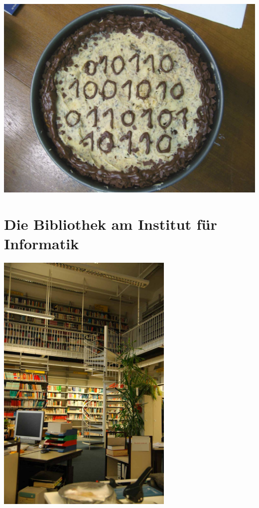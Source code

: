 \documentclass[a4paper,12pt]{scrartcl}
\newcommand{\spaltenanfang}{\begin{multicols}{2}}
\newcommand{\spaltenende}{\end{multicols}}
\begin{document}
\vspace{4mm}
\hspace{1cm}
\begin{center}
\includegraphics[scale=0.3]{bitmaps/101_kuchen}
\end{center}


\newpage
\section{Die Bibliothek am Institut für Informatik}
\spaltenanfang

\spaltenende

\begin{center}
\vspace{7mm}
\includegraphics[width=85mm]{fotos/bib}
\end{center}
\end{document}
